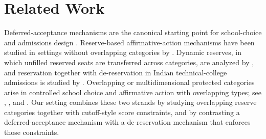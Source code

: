 \documentclass[10pt]{article}
\newcommand{\1}{\mathbf{1}}
\begin{document}
\section{Related Work}
Deferred-acceptance mechanisms are the canonical starting point for school-choice and admissions design \citep{GaSh62a,Roth08a,AbSo03b}. Reserve-based affirmative-action mechanisms have been studied in settings without overlapping categories by \citet{Abdu05a}. Dynamic reserves, in which unfilled reserved seats are transferred across categories, are analyzed by \citet{AyTu20a}, and reservation together with de-reservation in Indian technical-college admissions is studied by \citet{AyTu23a}. Overlapping or multidimensional protected categories arise in controlled school choice and affirmative action with overlapping types; see \citet{KHIY17a}, \citet{GKK+17a}, and \citet{AyBo21a}. Our setting combines these two strands by studying overlapping reserve categories together with cutoff-style score constraints, and by contrasting a deferred-acceptance mechanism with a de-reservation mechanism that enforces those constraints.



\end{document}
